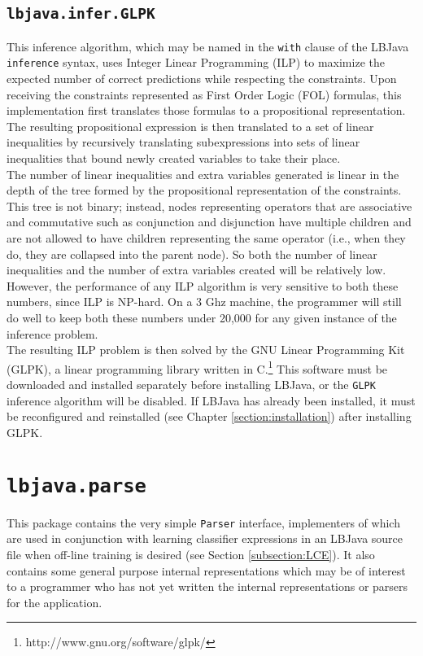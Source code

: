 \subsection{{\tt lbjava.infer.GLPK}} \label{subsection:GLPK}

This inference algorithm, which may be named in the {\tt with} clause of the
LBJava {\tt inference} syntax, uses Integer Linear Programming (ILP) to maximize
the expected number of correct predictions while respecting the constraints.
Upon receiving the constraints represented as First Order Logic (FOL)
formulas, this implementation first translates those formulas to a
propositional representation.  The resulting propositional expression is then
translated to a set of linear inequalities by recursively translating
subexpressions into sets of linear inequalities that bound newly created
variables to take their place. \\

The number of linear inequalities and extra variables generated is linear in
the depth of the tree formed by the propositional representation of the
constraints.  This tree is not binary; instead, nodes representing operators
that are associative and commutative such as conjunction and disjunction have
multiple children and are not allowed to have children representing the same
operator (i.e., when they do, they are collapsed into the parent node).  So
both the number of linear inequalities and the number of extra variables
created will be relatively low.  However, the performance of any ILP algorithm
is very sensitive to both these numbers, since ILP is NP-hard.  On a 3 Ghz
machine, the programmer will still do well to keep both these numbers under
20,000 for any given instance of the inference problem. \\

The resulting ILP problem is then solved by the GNU Linear Programming Kit
(GLPK), a linear programming library written in
C.\footnote{http://www.gnu.org/software/glpk/}  This software must be
downloaded and installed separately before installing LBJava, or the {\tt GLPK}
inference algorithm will be disabled.  If LBJava has already been installed, it
must be reconfigured and reinstalled (see Chapter \ref{section:installation})
after installing GLPK.

\section{{\tt lbjava.parse}}

This package contains the very simple {\tt Parser} interface, implementers of
which are used in conjunction with learning classifier expressions in an LBJava
source file when off-line training is desired (see Section
\ref{subsection:LCE}).  It also contains some general purpose internal
representations which may be of interest to a programmer who has not yet
written the internal representations or parsers for the application.

